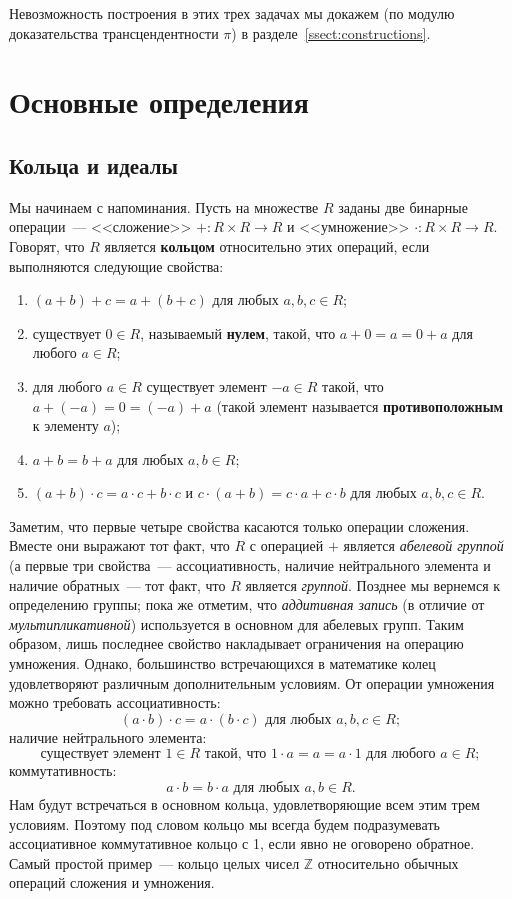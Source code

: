 \documentclass[a4paper,11pt]{scrartcl}
\theoremstyle{plain}
\theoremstyle{definition}
\newcommand\dfn[1]{\textbf{#1}}
\newcommand\mb{\mathbb}
\begin{document}
Невозможность построения в этих трех задачах мы докажем (по модулю
доказательства трансцендентности $\pi$) в разделе~\ref{ssect:constructions}.



\section{Основные определения}

\subsection{Кольца и идеалы}

Мы начинаем с напоминания. Пусть на множестве $R$ заданы две бинарные
операции~--- <<сложение>> $+\colon R\times R\to R$ и <<умножение>>
$\cdot\colon R\times R\to R$. Говорят, что $R$ является \dfn{кольцом}
относительно этих операций, если выполняются следующие свойства:
\begin{enumerate}
\item $(a+b)+c=a+(b+c)$ для любых $a,b,c\in R$;
\item существует $0\in R$, называемый \dfn{нулем}, такой, что
  $a+0=a=0+a$ для любого $a\in R$;
\item для любого $a\in R$ существует элемент $-a\in R$ такой, что
  $a+(-a)=0=(-a)+a$ (такой элемент называется \dfn{противоположным} к
  элементу $a$);
\item $a+b=b+a$ для любых $a,b\in R$;
\item $(a+b)\cdot c=a\cdot c+b\cdot c$ и $c\cdot (a+b)=c\cdot a+c\cdot
  b$ для любых $a,b,c\in R$.
\end{enumerate}
Заметим, что первые четыре свойства касаются только операции сложения.
Вместе они выражают тот факт, что $R$ с операцией $+$ является
\emph{абелевой группой} (а первые три свойства~--- ассоциативность,
наличие нейтрального элемента и наличие обратных~--- тот факт, что $R$
является \emph{группой}. Позднее мы вернемся к определению
группы; пока же отметим, что \emph{аддитивная запись} (в отличие от
\emph{мультипликативной}) используется в
основном для абелевых групп. Таким образом, лишь последнее свойство
накладывает ограничения
на операцию умножения. Однако, большинство встречающихся в математике
колец удовлетворяют различным дополнительным условиям. От операции
умножения можно требовать ассоциативность:
$$
(a\cdot b)\cdot c = a\cdot (b\cdot c)\text{ для любых $a,b,c\in R$};
$$
наличие нейтрального элемента:
$$
\text{существует элемент $1\in R$ такой, что }1\cdot a=a=a\cdot
1\text{ для любого $a\in R$};
$$
коммутативность:
$$
a\cdot b = b\cdot a\text{ для любых $a,b\in R$}.
$$
Нам будут встречаться в основном кольца, удовлетворяющие всем этим
трем условиям. Поэтому под словом кольцо мы всегда будем подразумевать
ассоциативное коммутативное кольцо с 1, если явно не оговорено
обратное. Самый простой пример~--- кольцо целых чисел $\mb Z$
относительно обычных операций сложения и умножения.
\end{document}
